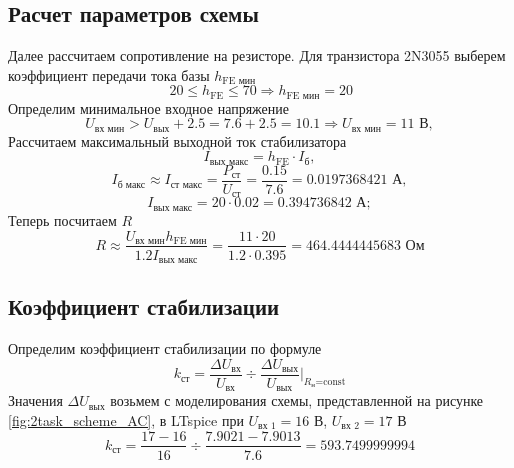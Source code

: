 \documentclass[a4paper, 12pt]{article}
\begin{document}
    
    \subsection{Расчет параметров схемы}
    Далее рассчитаем сопротивление на резисторе.
    Для транзистора 2N3055 выберем коэффициент передачи тока базы $h_{\text{FE мин}}$
    $$\,20\leq h_{\text{FE}}\leq70\Rightarrow h_{\text{FE мин}}=20$$
    Определим минимальное входное напряжение
    $$
    U_{\text{вх мин}}>U_{\text{вых}}+2.5=7.6+2.5=10.1\Rightarrow U_{\text{вх мин}}=11\text{ В},
    $$
    Рассчитаем максимальный выходной ток стабилизатора
    $$
    I_{\text{вых макс}}=h_{\text{FE}}\cdot I_{\text{б}},
    $$
    $$
    I_{\text{б макс}}\approx I_{\text{ст макс}}=\dfrac{P_{\text{ст}}}{U_{\text{ст}}}=\dfrac{0.15}{7.6}=0.0197368421\text{ А},
    $$
    $$
    I_{\text{вых макс}}=20\cdot0.02=0.394736842\text{ А};
    $$
    Теперь посчитаем $R$
    $$
    R\approx\dfrac{U_{\text{вх мин}}h_{\text{FE мин}}}{1.2I_{\text{вых макс}}}=\dfrac{11\cdot20}{1.2\cdot0.395}=464.4444445683\text{ Ом}
    $$


    \subsection{Коэффициент стабилизации}
    Определим коэффициент стабилизации по формуле
    $$
    k_{\text{ст}}=\dfrac{\Delta U_{\text{вх}}}{U_{\text{вх}}}\div\dfrac{\Delta U_{\text{вых}}}{U_{\text{вых}}}\bigg|_{R_\text{н}\text{=const}}
    $$
    Значения $\Delta U_{\text{вых}}$ возьмем с моделирования схемы, представленной на рисунке \ref{fig:2task_scheme_AC}, в LTspice
    при $U_{\text{вх 1}}=16$ В, $U_{\text{вх 2}}=17$ В
    $$
    k_{\text{ст}}=\dfrac{17-16}{16}\div\dfrac{7.9021-7.9013}{7.6}=593.7499999994
    $$
\end{document}
